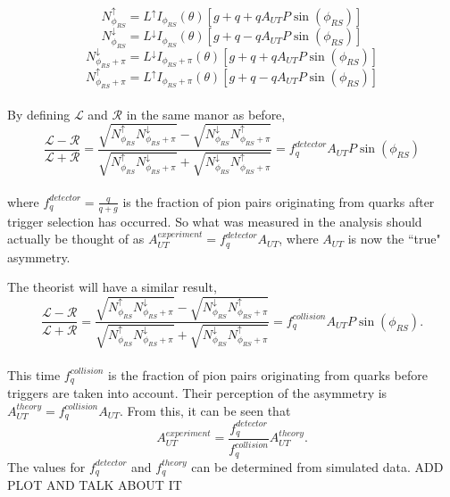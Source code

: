 \documentclass[abstract = on,listof=totoc, bibliography=totoc]{scrreprt}
\begin{document}
\begin{equation}
\label{eq:nupTB}
N^\uparrow_{\phi_{RS}} = L^\uparrow I_{\phi_{RS}}(\theta)\left[g+q+qA_{UT}P\sin(\phi_{RS})\right]
\end{equation}
\begin{equation}
\label{eq:ndwnTB}
N^\downarrow_{\phi_{RS}} = L^\downarrow I_{\phi_{RS}}(\theta)\left[g+q-qA_{UT}P\sin(\phi_{RS})\right]
\end{equation}
\begin{equation}
\label{eq:ndwnphiTB}
N^\downarrow_{\phi_{RS}+\pi} = L^\downarrow I_{\phi_{RS}+\pi}(\theta)\left[g+q+qA_{UT}P\sin(\phi_{RS})\right]
\end{equation}
\begin{equation}
\label{eq:nupphiTB}
N^\uparrow_{\phi_{RS}+\pi} = L^\uparrow I_{\phi_{RS}+\pi}(\theta)\left[g+q-qA_{UT}P\sin(\phi_{RS})\right]
\end{equation}\\
By defining $\mathcal{L}$ and $\mathcal{R}$ in the same manor as before, 
\begin{equation}
\label{eq:crossRatioTB}
\frac{\mathcal{L} - \mathcal{R}}{\mathcal{L} +\mathcal{R}} = \frac{\sqrt{N^\uparrow_{\phi_{RS}}N^\downarrow_{\phi_{RS}+\pi}} - \sqrt{N^\downarrow_{\phi_{RS}}N^\uparrow_{\phi_{RS}+\pi}}}{\sqrt{N^\uparrow_{\phi_{RS}}N^\downarrow_{\phi_{RS}+\pi}} + \sqrt{N^\downarrow_{\phi_{RS}}N^\uparrow_{\phi_{RS}+\pi}}} =f_q^{detector}A_{UT}P\sin(\phi_{RS})
\end{equation}\\
where $f_q^{detector} = \frac{q}{q+g}$ is the fraction of pion pairs originating from quarks after trigger selection has occurred. So what was measured in the analysis should actually be thought of as $A_{UT}^{experiment} = f_q^{detector}A_{UT}$, where $A_{UT}$ is now the ``true" asymmetry. 

The theorist will have a similar result,
\begin{equation}
\label{eq:crossRatioTBTh}
\frac{\mathcal{L} - \mathcal{R}}{\mathcal{L} +\mathcal{R}} = \frac{\sqrt{N^\uparrow_{\phi_{RS}}N^\downarrow_{\phi_{RS}+\pi}} - \sqrt{N^\downarrow_{\phi_{RS}}N^\uparrow_{\phi_{RS}+\pi}}}{\sqrt{N^\uparrow_{\phi_{RS}}N^\downarrow_{\phi_{RS}+\pi}} + \sqrt{N^\downarrow_{\phi_{RS}}N^\uparrow_{\phi_{RS}+\pi}}} =f_q^{collision}A_{UT}P\sin(\phi_{RS}).
\end{equation}\\
This time $f_q^{collision}$ is the fraction of pion pairs originating from quarks before triggers are taken into account. Their perception of the asymmetry is $A_{UT}^{theory} = f_q^{collision}A_{UT}$. 
From this, it can be seen that 
\begin{equation}
A_{UT}^{experiment}  = \frac{f_q^{detector}}{f_q^{collision}} A_{UT}^{theory}.
\end{equation}
The values for $f_q^{detector}$ and $f_q^{theory}$ can be determined from simulated data. ADD PLOT AND TALK ABOUT IT
\end{document}

